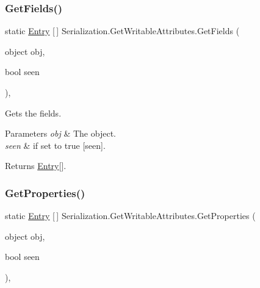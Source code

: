 \subsubsection{\texorpdfstring{Get\+Fields()}{GetFields()}}
{\footnotesize\ttfamily static \hyperlink{class_serialization_1_1_entry}{Entry} \mbox{[}$\,$\mbox{]} Serialization.\+Get\+Writable\+Attributes.\+Get\+Fields (\begin{DoxyParamCaption}\item[{object}]{obj,  }\item[{bool}]{seen }\end{DoxyParamCaption})\hspace{0.3cm}{\ttfamily [inline]}, {\ttfamily [static]}}



Gets the fields. 


\begin{DoxyParams}{Parameters}
{\em obj} & The object.\\
\hline
{\em seen} & if set to {\ttfamily true} \mbox{[}seen\mbox{]}.\\
\hline
\end{DoxyParams}
\begin{DoxyReturn}{Returns}
\hyperlink{class_serialization_1_1_entry}{Entry}\mbox{[}\mbox{]}.
\end{DoxyReturn}
\mbox{\label{class_serialization_1_1_get_writable_attributes_a328ba45c8e2f2e9678371ca201974632}} 
\subsubsection{\texorpdfstring{Get\+Properties()}{GetProperties()}}
{\footnotesize\ttfamily static \hyperlink{class_serialization_1_1_entry}{Entry} \mbox{[}$\,$\mbox{]} Serialization.\+Get\+Writable\+Attributes.\+Get\+Properties (\begin{DoxyParamCaption}\item[{object}]{obj,  }\item[{bool}]{seen }\end{DoxyParamCaption})\hspace{0.3cm}{\ttfamily [inline]}, {\ttfamily [static]}}



